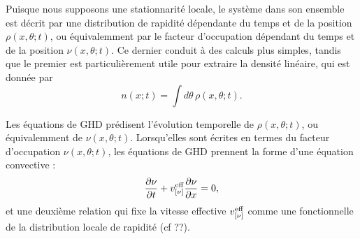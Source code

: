 Puisque nous supposons une stationnarité locale, le système dans son ensemble est décrit par une distribution de rapidité dépendante du temps et de la position $\rho(x,\theta ; t )$, ou équivalemment par le facteur d'occupation dépendant du temps et de la position $\nu(x,\theta ; t)$. Ce dernier conduit à des calculs plus simples, tandis que le premier est particulièrement utile pour extraire la densité linéaire, qui est donnée par
\begin{equation}
    \label{eq:lineardensity}
	n(x;t) = \int d\theta \, \rho(x,\theta ; t ) .
\end{equation}

Les équations de GHD \cite{bertini_transport_2016,castro-alvaredo_emergent_2016} prédisent l'évolution temporelle de $\rho(x,\theta ; t)$, ou équivalemment de $\nu(x,\theta ; t)$. Lorsqu'elles sont écrites en termes du facteur d'occupation $\nu(x,\theta ; t )$, les équations de GHD prennent la forme d'une équation convective :
\begin{equation}
\label{eq:nu.cont}
\frac{\partial \nu}{\partial t} + v^{\rm{eff}}_{[\nu]} \frac{\partial \nu}{\partial x} = 0 ,
\end{equation}
et une deuxième relation qui fixe la vitesse effective $v^{\rm{eff}}_{[\nu]}$ comme une fonctionnelle de la distribution locale de rapidité (cf {??}).
